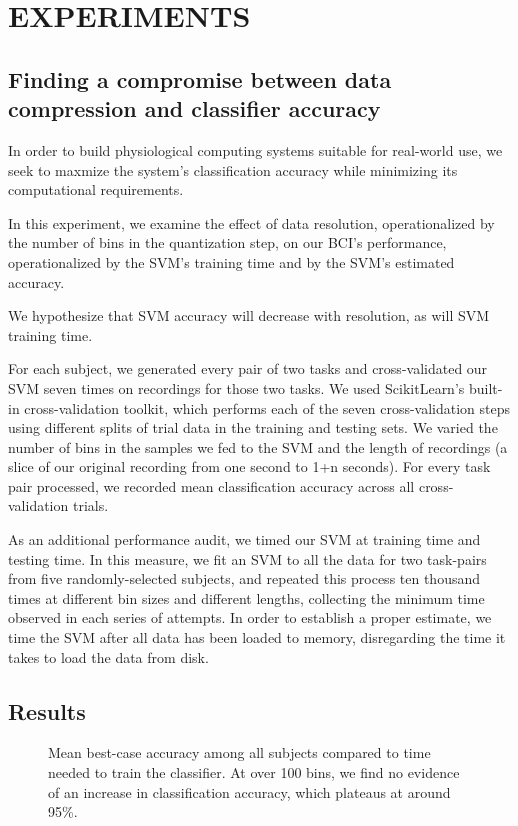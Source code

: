 \section{\uppercase{Experiments}}

\subsection{Finding a compromise between data compression and classifier accuracy}

In order to build physiological computing systems suitable for real-world use, we seek to maxmize the system's classification accuracy while minimizing its computational requirements.

In this experiment, we examine the effect of data resolution, operationalized by the number of bins in the quantization step, on our BCI's performance, operationalized by the SVM's training time and by the SVM's estimated accuracy. 

We hypothesize that SVM accuracy will decrease with resolution, as will SVM training time.

For each subject, we generated every pair of two tasks and cross-validated our SVM seven times on recordings for those two tasks. We used ScikitLearn's built-in cross-validation toolkit, which performs each of the seven cross-validation steps using different splits of trial data in the training and testing sets. We varied the number of bins in the samples we fed to the SVM and the length of recordings (a slice of our original recording from one second to 1+n seconds). For every task pair processed, we recorded mean classification accuracy across all cross-validation trials.

As an additional performance audit, we timed our SVM at training time and testing time. In this measure, we fit an SVM to all the data for two task-pairs from five randomly-selected subjects, and repeated this process ten thousand times at different bin sizes and different lengths, collecting the minimum time observed in each series of attempts. In order to establish a proper estimate, we time the SVM after all data has been loaded to memory, disregarding the time it takes to load the data from disk.

\subsection{Results}

\begin{figure}[!h]
  \vspace{-0.2cm}
  \centering
   {}
  \caption{Mean best-case accuracy among all subjects compared to time needed to train the classifier. At over 100 bins, we find no evidence of an increase in classification accuracy, which plateaus at around 95\%. }
  \label{fig:fig1a}
  \vspace{-0.1cm}
 \end{figure}

